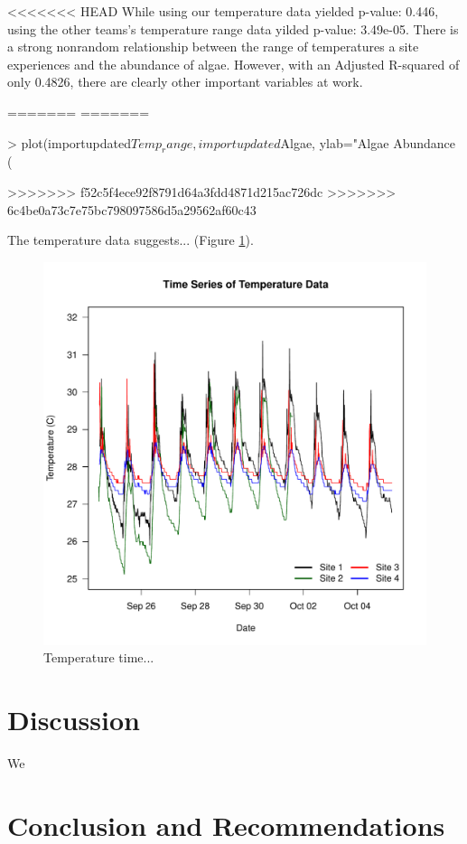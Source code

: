 \documentclass{article}\usepackage[]{graphicx}\usepackage[]{color}
\begin{document}
<<<<<<< HEAD
While using our temperature data yielded p-value: 0.446, using the other teams's temperature range data yilded p-value: 3.49e-05. There is a strong nonrandom relationship between the range of temperatures a site experiences and the abundance of algae. However, with an Adjusted R-squared of only 0.4826, there are clearly other important variables at work. 

=======
=======
\begin{Schunk}
\begin{Sinput}
> plot(importupdated$Temp_range,importupdated$Algae, ylab="Algae Abundance (%
\end{Sinput}
\end{Schunk}
>>>>>>> f52c5f4ece92f8791d64a3fdd4871d215ac726dc
>>>>>>> 6c4be0a73c7e75bc798097586d5a29562af60c43

The temperature data suggests... (Figure \ref{Temp}).

\begin{figure}
\includegraphics{Figures/Temp}
\caption{Temperature time...}
\label{Temp}
\end{figure}

\section{Discussion}
We

\section{Conclusion and Recommendations}
\end{document}
